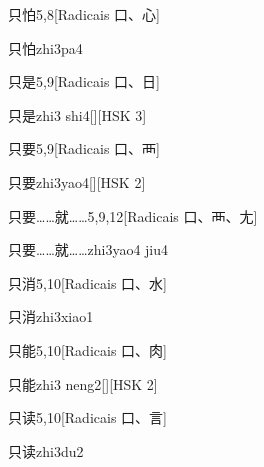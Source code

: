 \begin{entry}{只怕}{5,8}[Radicais ⼝、⼼]
  \begin{phonetics}{只怕}{zhi3pa4}
  \end{phonetics}
\end{entry}

\begin{entry}{只是}{5,9}[Radicais ⼝、⽇]
  \begin{phonetics}{只是}{zhi3 shi4}[][HSK 3]
  \end{phonetics}
\end{entry}

\begin{entry}{只要}{5,9}[Radicais ⼝、⾑]
  \begin{phonetics}{只要}{zhi3yao4}[][HSK 2]
  \end{phonetics}
\end{entry}

\begin{entry}{只要……就……}{5,9,12}[Radicais ⼝、⾑、⼪]
  \begin{phonetics}{只要……就……}{zhi3yao4 jiu4}
  \end{phonetics}
\end{entry}

\begin{entry}{只消}{5,10}[Radicais ⼝、⽔]
  \begin{phonetics}{只消}{zhi3xiao1}
  \end{phonetics}
\end{entry}

\begin{entry}{只能}{5,10}[Radicais ⼝、⾁]
  \begin{phonetics}{只能}{zhi3 neng2}[][HSK 2]
  \end{phonetics}
\end{entry}

\begin{entry}{只读}{5,10}[Radicais ⼝、⾔]
  \begin{phonetics}{只读}{zhi3du2}
  \end{phonetics}
\end{entry}

